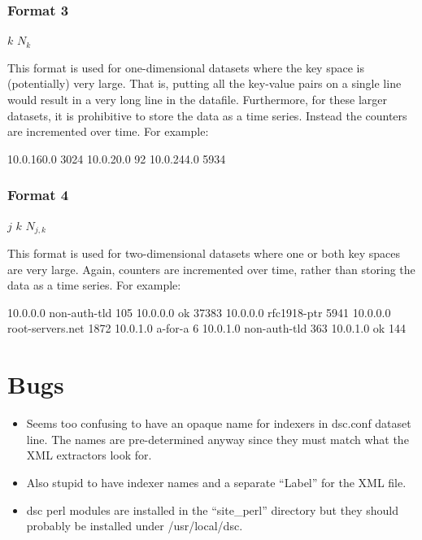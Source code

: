 \documentclass{report}
\def\dsc{{\sc dsc}}
\begin{document}
\subsection{Format 3}

\noindent
\begin{tt}$k$ $N_{k}$
\end{tt}

\vspace{1ex}\noindent
This format is used for one-dimensional datasets where the key space
is (potentially) very large.  That is, putting all the key-value pairs
on a single line would result in a very long line in the datafile.
Furthermore, for these larger datasets, it is prohibitive to
store the data as a time series.  Instead the counters are incremented
over time.  For example:

\begin{MyVerbatim}
10.0.160.0 3024
10.0.20.0 92
10.0.244.0 5934
\end{MyVerbatim}

\subsection{Format 4}

\noindent
\begin{tt}$j$ $k$ $N_{j,k}$
\end{tt}

\vspace{1ex}\noindent
This format is used for two-dimensional datasets where one or both
key spaces are very large.  Again, counters are incremented over
time, rather than storing the data as a time series.
For example:

\begin{MyVerbatim}
10.0.0.0 non-auth-tld 105
10.0.0.0 ok 37383
10.0.0.0 rfc1918-ptr 5941
10.0.0.0 root-servers.net 1872
10.0.1.0 a-for-a 6
10.0.1.0 non-auth-tld 363
10.0.1.0 ok 144
\end{MyVerbatim}

\chapter{Bugs}

\begin{itemize}

\item
	Seems too confusing to have an opaque name for indexers in
	dsc.conf dataset line.  The names are pre-determined anyway
	since they must match what the XML extractors look for.
\item
	Also stupid to have indexer names and a separate ``Label'' for
	the XML file.

\item
	{\dsc} perl modules are installed in the ``site\_perl'' directory
	but they should probably be installed under /usr/local/dsc.

\end{itemize}
\end{document}
